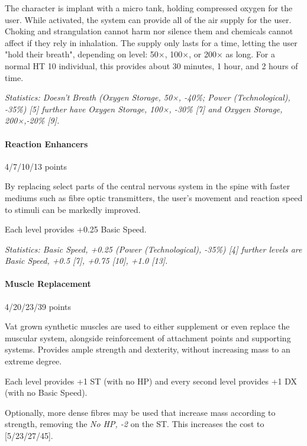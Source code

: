 \begin{multicols*}{3}
	The character is implant with a micro tank, holding compressed oxygen for the user. While activated, the system can provide all of the air supply for the user. Choking and strangulation cannot harm nor silence them and chemicals cannot affect if they rely in inhalation. The supply only lasts for a time, letting the user "hold their breath", depending on level: 50×, 100×, or 200× as long. For a normal HT 10 individual, this provides about 30 minutes, 1 hour, and 2 hours of time.
	
	\textit{\textcolor{OliveGreen}{Statistics: Doesn't Breath (Oxygen Storage, 50×, -40\%; Power (Technological), -35\%) [5] further have Oxygen Storage, 100×, -30\% [7] and Oxygen Storage, 200×,-20\% [9].}}
	
	\paragraph{Reaction Enhancers}
	\begin{flushright}
		4/7/10/13 points
	\end{flushright}
	
	By replacing select parts of the central nervous system in the spine with faster mediums such as fibre optic transmitters, the user's movement and reaction speed to stimuli can be markedly improved.
	
	Each level provides +0.25 Basic Speed.
	
	\textit{\textcolor{OliveGreen}{Statistics: Basic Speed, +0.25 (Power (Technological), -35\%) [4] further levels are Basic Speed, +0.5 [7], +0.75 [10], +1.0 [13].}}
	
	\paragraph{Muscle Replacement}
	\begin{flushright}
		4/20/23/39 points
	\end{flushright}
	
	Vat grown synthetic muscles are used to either supplement or even replace the muscular system, alongside reinforcement of attachment points and supporting systems. Provides ample strength and dexterity, without increasing mass to an extreme degree.
	
	Each level provides +1 ST (with no HP) and every second level provides +1 DX (with no Basic Speed).
	
	Optionally, more dense fibres may be used that increase mass according to strength, removing the \textit{No HP, -2} on the ST. This increases the cost to [5/23/27/45].
	

\end{multicols*}
